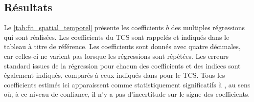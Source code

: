 \documentclass[../main.tex]{subfiles}
\begin{document}
\subsection{Résultats}\label{sec:apport_resultat}

Le \cref{tab:fit_spatial_temporel} présente les coefficients $b$ des multiples régressions qui sont réalisées. Les coefficients du TCS sont rappelés et indiqués
dans le tableau à titre de référence. Les coefficients sont donnés avec quatre décimales, car celles-ci ne varient pas lorsque les régressions sont répétées.
Les erreurs standard issues de la régression pour chacun des coefficients et des indices sont également indiqués, comparés à ceux indiqués dans
\textcite{tippett_poisson_2011} pour le TCS. Tous les coefficients estimés ici apparaissent comme statistiquement significatifs à , au sens où, à ce
niveau de confiance, il n'y a pas d'incertitude sur le signe des coefficients.
\end{document}
